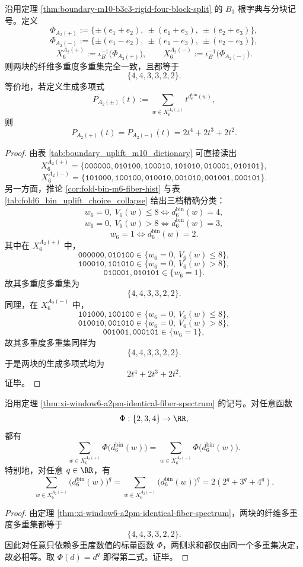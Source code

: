 \begin{theorem}\label{thm:xi-window6-a2pm-identical-fiber-spectrum}
沿用定理 \ref{thm:boundary-m10-b3c3-rigid-four-block-split} 的 \(B_3\) 根字典与分块记号。定义
\[
\Phi_{A_2(+)}
:=
\{\pm(e_1+e_2),\ \pm(e_1+e_3),\ \pm(e_2+e_3)\},
\]
\[
\Phi_{A_2(-)}
:=
\{\pm(e_1-e_2),\ \pm(e_1-e_3),\ \pm(e_2-e_3)\},
\]
\[
X_6^{A_2(+)}:=\iota_B^{-1}\bigl(\Phi_{A_2(+)}\bigr),
\qquad
X_6^{A_2(-)}:=\iota_B^{-1}\bigl(\Phi_{A_2(-)}\bigr).
\]
则两块的纤维多重度多重集完全一致，且都等于
\[
\{4,4,3,3,2,2\}.
\]
等价地，若定义生成多项式
\[
P_{A_2(\pm)}(t):=\sum_{w\in X_6^{A_2(\pm)}} t^{d_6^{\mathrm{bin}}(w)},
\]
则
\[
P_{A_2(+)}(t)=P_{A_2(-)}(t)=2t^4+2t^3+2t^2.
\]
\end{theorem}
\begin{proof}
由表 \ref{tab:boundary_uplift_m10_dictionary} 可直接读出
\[
X_6^{A_2(+)}
=
\{\texttt{000000},\texttt{010100},\texttt{100010},
\texttt{101010},\texttt{010001},\texttt{010101}\},
\]
\[
X_6^{A_2(-)}
=
\{\texttt{101000},\texttt{100100},\texttt{010010},
\texttt{001010},\texttt{001001},\texttt{000101}\}.
\]
另一方面，推论 \ref{cor:fold-bin-m6-fiber-hist} 与表 \ref{tab:fold6_bin_uplift_choice_collapse} 给出三档精确分类：
\[
w_6=0,\ V_6(w)\le 8 \Longleftrightarrow d_6^{\mathrm{bin}}(w)=4,
\]
\[
w_6=0,\ V_6(w)>8 \Longleftrightarrow d_6^{\mathrm{bin}}(w)=3,
\]
\[
w_6=1 \Longleftrightarrow d_6^{\mathrm{bin}}(w)=2.
\]
其中在 \(X_6^{A_2(+)}\) 中，
\[
\texttt{000000},\texttt{010100}\in\{w_6=0,\ V_6(w)\le 8\},
\]
\[
\texttt{100010},\texttt{101010}\in\{w_6=0,\ V_6(w)>8\},
\]
\[
\texttt{010001},\texttt{010101}\in\{w_6=1\}.
\]
故其多重度多重集为
\[
\{4,4,3,3,2,2\}.
\]
同理，在 \(X_6^{A_2(-)}\) 中，
\[
\texttt{101000},\texttt{100100}\in\{w_6=0,\ V_6(w)\le 8\},
\]
\[
\texttt{010010},\texttt{001010}\in\{w_6=0,\ V_6(w)>8\},
\]
\[
\texttt{001001},\texttt{000101}\in\{w_6=1\},
\]
故其多重度多重集同样为
\[
\{4,4,3,3,2,2\}.
\]
于是两块的生成多项式均为
\[
2t^4+2t^3+2t^2.
\]
证毕。
\end{proof}

\begin{corollary}\label{cor:xi-window6-a2pm-multiplicity-blind-statistics}
沿用定理 \ref{thm:xi-window6-a2pm-identical-fiber-spectrum} 的记号。对任意函数
\[
\Phi:\{2,3,4\}\to \RR,
\]
都有
\[
\sum_{w\in X_6^{A_2(+)}}\Phi\!\bigl(d_6^{\mathrm{bin}}(w)\bigr)
=
\sum_{w\in X_6^{A_2(-)}}\Phi\!\bigl(d_6^{\mathrm{bin}}(w)\bigr).
\]
特别地，对任意 \(q\in\RR\)，有
\[
\sum_{w\in X_6^{A_2(+)}}\bigl(d_6^{\mathrm{bin}}(w)\bigr)^q
=
\sum_{w\in X_6^{A_2(-)}}\bigl(d_6^{\mathrm{bin}}(w)\bigr)^q
=
2(2^q+3^q+4^q).
\]
\end{corollary}
\begin{proof}
由定理 \ref{thm:xi-window6-a2pm-identical-fiber-spectrum}，两块的纤维多重度多重集都等于
\[
\{4,4,3,3,2,2\}.
\]
因此对任意只依赖多重度数值的标量函数 \(\Phi\)，两侧求和都仅由同一个多重集决定，故必相等。取 \(\Phi(d)=d^q\) 即得第二式。证毕。
\end{proof}

